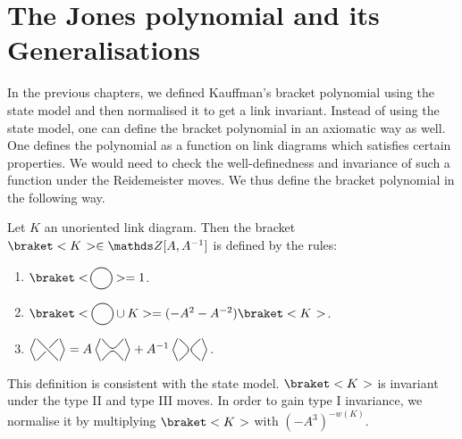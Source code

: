 \chapter{The Jones polynomial and its Generalisations}

In the previous chapters, we defined Kauffman's bracket polynomial using the state model and then normalised it to get a link invariant. Instead of using the state model, one can define the bracket polynomial in an axiomatic way as well. One defines the polynomial as a function on link diagrams which satisfies certain properties. We would need to check the well-definedness and invariance of such a function under the Reidemeister moves. We thus define the bracket polynomial in the following way.

\begin{defn}
	Let \(K\) an unoriented link diagram. Then the bracket \(\bk \in \Z[A, A^{-1}]\) is defined by the rules:
	\begin{enumerate}
		\item \(\braket<\hspace{-0.9pt}\KPA> = 1\).
		\item \(\braket<\KPA \cup K> = (-A^2 - A^{-2}) \braket<K\hspace{1pt}>\).
		\item \(\BB = A\BD + A^{-1}\BE\).
	\end{enumerate}
\end{defn}

This definition is consistent with the state model. \(\bk\) is invariant under the type II and type III moves. In order to gain type I invariance, we normalise it by multiplying \(\bk\) with \((-A^3)^{-w(K)}\).
